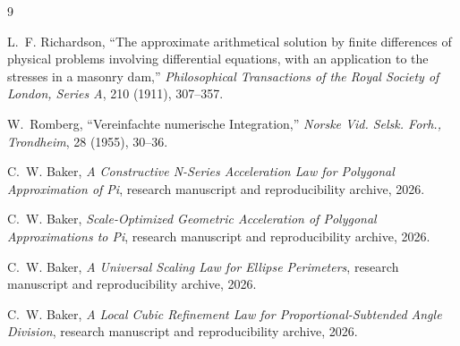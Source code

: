 \documentclass[11pt]{article}
\theoremstyle{remark}
\begin{document}
\begin{thebibliography}{9}

L.~F. Richardson,
``The approximate arithmetical solution by finite differences of physical
problems involving differential equations, with an application to the
stresses in a masonry dam,''
\emph{Philosophical Transactions of the Royal Society of London, Series A},
210 (1911), 307--357.

W.~Romberg,
``Vereinfachte numerische Integration,''
\emph{Norske Vid. Selsk. Forh., Trondheim},
28 (1955), 30--36.

C.~W. Baker,
\emph{A Constructive N-Series Acceleration Law for Polygonal Approximation of Pi},
research manuscript and reproducibility archive, 2026.

C.~W. Baker,
\emph{Scale-Optimized Geometric Acceleration of Polygonal Approximations to Pi},
research manuscript and reproducibility archive, 2026.

C.~W. Baker,
\emph{A Universal Scaling Law for Ellipse Perimeters},
research manuscript and reproducibility archive, 2026.

C.~W. Baker,
\emph{A Local Cubic Refinement Law for Proportional-Subtended Angle Division},
research manuscript and reproducibility archive, 2026.

\end{thebibliography}
\end{document}
